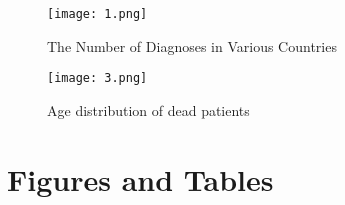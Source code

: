 \documentclass[12pt,english]{article}
\begin{document}
\newpage
\printbibliography
\newpage
\begin{figure}[ht]
\centering
\bigskip{}
\texttt{[image: 1.png]}
\caption{The Number of Diagnoses in Various Countries}
\label{fig:fig1}
\end{figure}
\newpage

\begin{figure}
\centering
\bigskip{}
\texttt{[image: 3.png]}
\caption{Age distribution of dead patients}
\label{fig:fig1}
\end{figure}
\vfill
\pagebreak{}
\clearpage
\section*{Figures and Tables}
\end{document}
